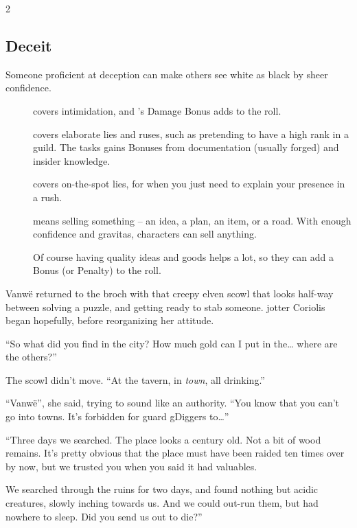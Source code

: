 \begin{multicols}{2}

\subsection{Deceit}

Someone proficient at deception can make others see white as black by sheer confidence.

\begin{description}
  \item[]
    covers intimidation, and 's Damage Bonus adds to the roll.
  \item[]
    covers elaborate lies and ruses, such as pretending to have a high rank in a guild.
    The tasks gains Bonuses from documentation (usually forged) and insider knowledge.
  \item[]
    covers on-the-spot lies, for when you just need to explain your presence in a rush.
  \item[]
    means selling something -- an idea, a plan, an item, or a road.
    With enough confidence and gravitas, characters can sell anything.

    Of course having quality ideas and goods helps a lot, so they can add a Bonus (or Penalty) to the roll.
\end{description}


\begin{exampletext}
  Vanw\"e returned to the \gls{broch} with that creepy elven scowl that looks half-way between solving a puzzle, and getting ready to stab someone.
  \Gls{jotter} Coriolis began hopefully, before reorganizing her attitude.

  ``So what did you find in the city?
  How much gold can I put in the\ldots
  where are the others?''

  The scowl didn't move.
  ``At the tavern, in \emph{town}, all drinking.''

  ``Vanw\"e'', she said, trying to sound like an authority.
  ``You know that you can't go into towns.
  It's forbidden for \gls{guard} \glspl{gDigger} to\ldots''

  ``Three days we searched.
  The place looks a century old.
  Not a bit of wood remains.
  It's pretty obvious that the place must have been raided ten times over by now, but we trusted you when you said it had valuables.

  We searched through the ruins for two days, and found nothing but acidic creatures, slowly inching towards us.
  And we could out-run them, but had nowhere to sleep.
  Did you send us out to die?''


\end{exampletext}
\end{multicols}
